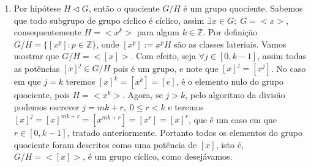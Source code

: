 \documentclass{article}
\begin{document}
\begin{enumerate}
		\item Por hipótese $H \vartriangleleft G$, então o quociente $G/H$ é um grupo quociente. Sabemos que todo subgrupo de grupo cíclico é cíclico, assim $\exists x \in G; \; G=<x>$, consequentemente $H = <x^{k}>$ para algum $k \in \mathbb{Z}$. Por definição $G/H = \{[x^{p}]: p\in \mathbb{Z}\}$, onde $[x^{p}]:=x^{p}H$ são as classes lateriais. Vamos mostrar que $G/H = <[x]>$. Com efeito, seja $\forall j \in [0, k-1]$, assim todas as potências $[x]^{j} \in G/H$ pois é um grupo, e note que $[x]^{j}=[x^{j}]$. No caso em que $j=k$ teremos $[x]^{k} = [x^{k}] = [e]$, é o elemento nulo do grupo quociente, pois $H=<x^{k}>$. Agora, se $j>k$, pelo algoritmo da divisão podemos escrever $j = mk +r, \; 0\leq r < k$ e teremos $[x]^{j}= [x]^{mk+r} = [x^{mk+r}] = [x^{r}]=[x]^{r}$, que é um caso em que $r \in [0, k-1]$, tratado anteriormente. Portanto todos os elementos do grupo quociente foram descritos como uma potência de $[x]$, isto é, $G/H = <[x]>$, é um grupo cíclico, como desejávamos.
		
		
\end{enumerate}
		
\end{document}
